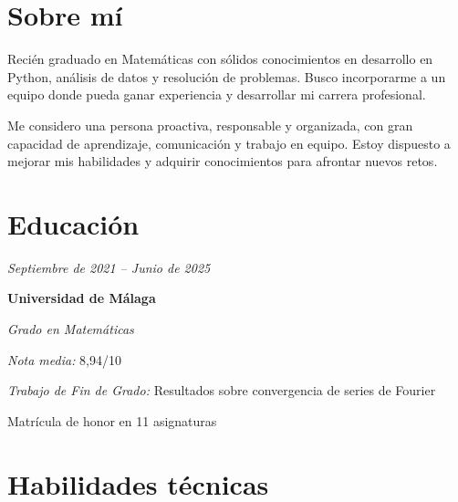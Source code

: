 \documentclass[10pt, letterpaper]{article}
\begin{document}
    \section{Sobre mí}
        \begin{onecolentry}
            Recién graduado en Matemáticas con sólidos conocimientos en desarrollo en Python, análisis de datos y resolución de problemas. Busco incorporarme a un equipo donde pueda ganar experiencia y desarrollar mi carrera profesional.
            
            \vspace{0.2 cm}

            Me considero una persona proactiva, responsable y organizada, con gran capacidad de aprendizaje, comunicación y trabajo en equipo. Estoy dispuesto a mejorar mis habilidades y adquirir conocimientos para afrontar nuevos retos.

        \end{onecolentry}

    \section{Educación}

        \begin{twocolentry}{
            
        \textit{Septiembre de 2021 – Junio de 2025}}
            \textbf{Universidad de Málaga}

            \textit{Grado en Matemáticas}
        \end{twocolentry}

        \vspace{0.10 cm}
        \begin{onecolentry}
            \begin{highlights}
                \item \emph{Nota media:} 8,94/10 %
                \item \emph{Trabajo de Fin de Grado:} Resultados sobre convergencia de series de Fourier
                \item Matrícula de honor en 11 asignaturas
            \end{highlights}
        \end{onecolentry}
    
    \section{Habilidades técnicas}
 
\end{document}
